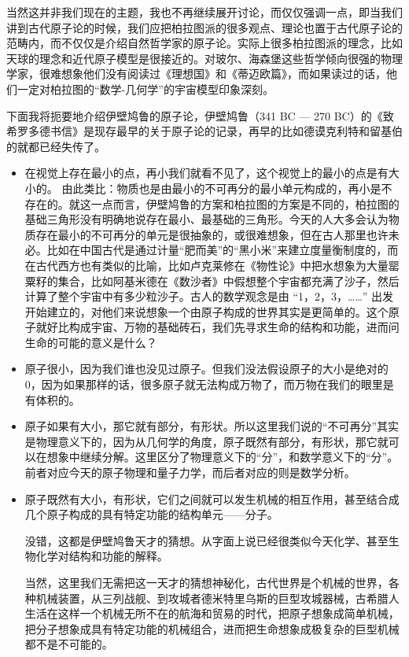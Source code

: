 当然这并非我们现在的主题，我也不再继续展开讨论，而仅仅强调一点，即当我们讲到古代原子论的时候，我们应把柏拉图派的很多观点、理论也置于古代原子论的范畴内，而不仅仅是介绍自然哲学家的原子论。实际上很多柏拉图派的理念，比如天球的理念和近代原子模型是很接近的。对玻尔、海森堡这些哲学倾向很强的物理学家，很难想象他们没有阅读过《理想国》和《蒂迈欧篇》，而如果读过的话，他们一定对柏拉图的“数学-几何学”的宇宙模型印象深刻。

下面我将扼要地介绍伊壁鸠鲁的原子论，伊壁鸠鲁（341 BC — 270 BC）的《致希罗多德书信》是现存最早的关于原子论的记录，再早的比如德谟克利特和留基伯的就都已经失传了。

\begin{itemize}
\item 在视觉上存在最小的点，再小我们就看不见了，这个视觉上的最小的点是有大小的。 由此类比：物质也是由最小的不可再分的最小单元构成的，再小是不存在的。就这一点而言，伊壁鸠鲁的方案和柏拉图的方案是不同的，柏拉图的基础三角形没有明确地说存在最小、最基础的三角形。今天的人大多会认为物质存在最小的不可再分的单元是很抽象的，或很难想象，但在古人那里也许未必。比如在中国古代是通过计量“肥而美”的“黑小米”来建立度量衡制度的，而在古代西方也有类似的比喻，比如卢克莱修在《物性论》中把水想象为大量罂粟籽的集合，比如阿基米德在《数沙者》中假想整个宇宙都充满了沙子，然后计算了整个宇宙中有多少粒沙子。古人的数学观念是由 “1，2，3，……” 出发开始建立的，对他们来说想象一个由原子构成的世界其实是更简单的。这个原子就好比构成宇宙、万物的基础砖石，我们先寻求生命的结构和功能，进而问生命的可能的意义是什么？

\item 原子很小，因为我们谁也没见过原子。但我们没法假设原子的大小是绝对的0，因为如果那样的话，很多原子就无法构成万物了，而万物在我们的眼里是有体积的。

\item 原子如果有大小，那它就有部分，有形状。所以这里我们说的“不可再分”其实是物理意义下的，因为从几何学的角度，原子既然有部分，有形状，那它就可以在想象中继续分解。这里区分了物理意义下的“分”，和数学意义下的“分”。前者对应今天的原子物理和量子力学，而后者对应的则是数学分析。

\item 
原子既然有大小，有形状，它们之间就可以发生机械的相互作用，甚至结合成几个原子构成的具有特定功能的结构单元——分子。

没错，这都是伊壁鸠鲁天才的猜想。从字面上说已经很类似今天化学、甚至生物化学对结构和功能的解释。

当然，这里我们无需把这一天才的猜想神秘化，古代世界是个机械的世界，各种机械装置，从三列战舰、到攻城者德米特里乌斯的巨型攻城器械，古希腊人生活在这样一个机械无所不在的航海和贸易的时代，把原子想象成简单机械，把分子想象成具有特定功能的机械组合，进而把生命想象成极复杂的巨型机械都不是不可能的。
\end{itemize}

